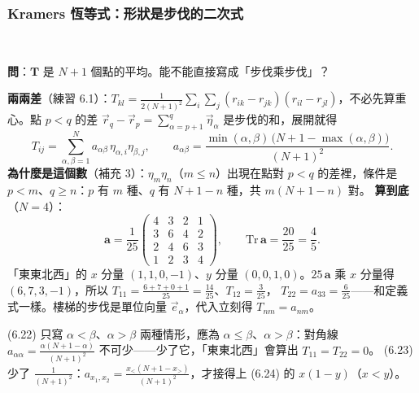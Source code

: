 \begin{table}[htbp]
\centering
\small
\SixTabStair
\caption{上：樓梯（$N=3$）與 Kramers 矩陣（$N=4$）的特徵值，精確值與大 $N$ 公式 $\frac{N+1}{\pi^2k^2}$（$k$ 小時接近）。
下左：$d\to\infty$ 的樓梯非球度 $\to\frac25$；下右：三維的主迴轉半徑比（模擬是三維格子 2 萬條 100 步）}\label{six-tab-stair}
\end{table}

\subsubsection{Kramers 恆等式：形狀是步伐的二次式}\label{six-sec-kramers}
\leavevmode{}\ \par\nopagebreak

\textbf{問}：$\mathbf T$ 是 $N+1$ 個點的平均。能不能直接寫成「步伐乘步伐」？

\textbf{兩兩差}（練習 6.1）：$T_{kl}=\frac{1}{2(N+1)^2}\sum_i\sum_j(r_{ik}-r_{jk})(r_{il}-r_{jl})$，不必先算重心。點 $p<q$ 的差 $\vec r_q-\vec r_p=\sum_{\alpha=p+1}^{q}\vec\eta_\alpha$ 是步伐的和，展開就得
\[T_{ij}=\sum_{\alpha,\beta=1}^{N}a_{\alpha\beta}\,\eta_{\alpha,i}\eta_{\beta,j},\qquad
a_{\alpha\beta}=\frac{\min(\alpha,\beta)\,\big(N+1-\max(\alpha,\beta)\big)}{(N+1)^2}.\tag{6.21, 6.22}\]
\textbf{為什麼是這個數}（補充 3）：$\eta_m\eta_n$（$m\le n$）出現在點對 $p<q$ 的差裡，條件是 $p<m$、$q\ge n$：$p$ 有 $m$ 種、$q$ 有 $N+1-n$ 種，共 $m(N+1-n)$ 對。
\textbf{算到底}（$N=4$）：
\[\mathbf a=\frac1{25}\begin{pmatrix}4&3&2&1\\3&6&4&2\\2&4&6&3\\1&2&3&4\end{pmatrix},\qquad \mathrm{Tr}\,\mathbf a=\frac{20}{25}=\frac45 .\]
「東東北西」的 $x$ 分量 $(1,1,0,-1)$、$y$ 分量 $(0,0,1,0)$。$25\,\mathbf a$ 乘 $x$ 分量得 $(6,7,3,-1)$，所以 $T_{11}=\frac{6+7+0+1}{25}=\frac{14}{25}$、$T_{12}=\frac3{25}$，
$T_{22}=a_{33}=\frac6{25}$——和定義式一樣。樓梯的步伐是單位向量 $\vec e_\alpha$，代入立刻得 $T_{nm}=a_{nm}$。
\begin{errbox}[p.~139，(6.22)(6.23)]
(6.22) 只寫 $\alpha<\beta$、$\alpha>\beta$ 兩種情形，應為 $\alpha\le\beta$、$\alpha>\beta$：對角線 $a_{\alpha\alpha}=\frac{\alpha(N+1-\alpha)}{(N+1)^2}$ 不可少——少了它，「東東北西」會算出 $T_{11}=T_{22}=0$。
(6.23) 少了 $\frac1{(N+1)^2}$：$a_{x_1,x_2}=\frac{x_<(N+1-x_>)}{(N+1)^2}$，才接得上 (6.24) 的 $x(1-y)$（$x<y$）。
\end{errbox}

